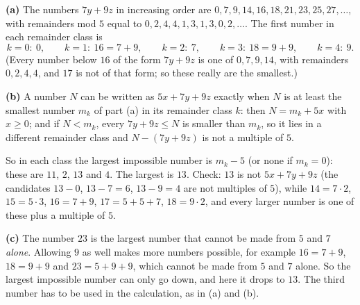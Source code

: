 \textbf{(a)} The numbers $7y+9z$ in increasing order are $0,7,9,14,16,18,21,23,25,27,\ldots$, with remainders mod $5$ equal to $0,2,4,4,1,3,1,3,0,2,\ldots$. The first number in each remainder class is
\[k=0:\ 0,\qquad k=1:\ 16=7+9,\qquad k=2:\ 7,\qquad k=3:\ 18=9+9,\qquad k=4:\ 9 .\]
(Every number below $16$ of the form $7y+9z$ is one of $0,7,9,14$, with remainders $0,2,4,4$, and $17$ is not of that form; so these really are the smallest.)

\textbf{(b)} A number $N$ can be written as $5x+7y+9z$ exactly when $N$ is at least the smallest number $m_k$ of part (a) in its remainder class $k$: then $N=m_k+5x$ with $x\ge0$; and if $N<m_k$, every $7y+9z\le N$ is smaller than $m_k$, so it lies in a different remainder class and $N-(7y+9z)$ is not a multiple of $5$.

So in each class the largest impossible number is $m_k-5$ (or none if $m_k=0$): these are $11$, $2$, $13$ and $4$. The largest is $\boxed{13}$. Check: $13$ is not $5x+7y+9z$ (the candidates $13-0$, $13-7=6$, $13-9=4$ are not multiples of $5$), while $14=7\cdot2$, $15=5\cdot3$, $16=7+9$, $17=5+5+7$, $18=9\cdot2$, and every larger number is one of these plus a multiple of $5$.

\textbf{(c)} The number $23$ is the largest number that cannot be made from $5$ and $7$ \emph{alone}. Allowing $9$ as well makes more numbers possible, for example $16=7+9$, $18=9+9$ and $23=5+9+9$, which cannot be made from $5$ and $7$ alone. So the largest impossible number can only go down, and here it drops to $13$. The third number has to be used in the calculation, as in (a) and (b).
